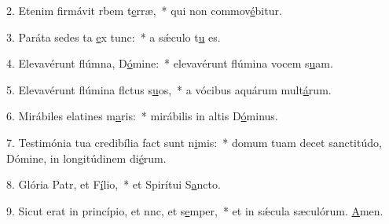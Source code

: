 2. Etenim firmávit rbem t\uline{e}rræ,~* qui non commov\uline{é}bitur.\par 
3. Paráta sedes ta \uline{e}x tunc:~* a sǽculo t\uline{u} es.\par 
4. Elevavérunt flúmna, D\uline{ó}mine:~* elevavérunt flúmina vocem s\uline{u}am.\par 
5. Elevavérunt flúmina flctus s\uline{u}os,~* a vócibus aquárum mult\uline{á}rum.\par 
6. Mirábiles elatines m\uline{a}ris:~* mirábilis in altis D\uline{ó}minus.\par 
7. Testimónia tua credibília fact sunt n\uline{i}mis:~* domum tuam decet sanctitúdo, Dómine, in longitúdinem di\uline{é}rum.\par 
8. Glória Patr, et F\uline{í}lio,~* et Spirítui S\uline{a}ncto.\par 
9. Sicut erat in princípio, et nnc, et s\uline{e}mper,~* et in sǽcula sæculórum. \uline{A}men.\par 
